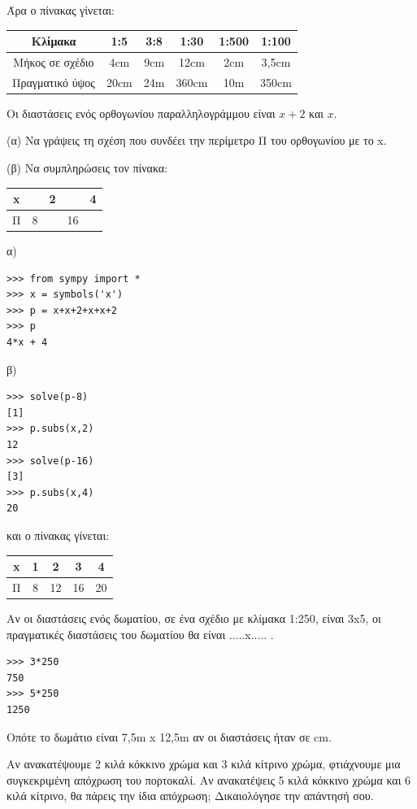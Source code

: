 Άρα ο πίνακας γίνεται:
\begin{table}
\begin{tabular}{|c|c|c|c|c|c|}
\hline
Κλίμακα&1:5&3:8&1:30&1:500&1:100\\\hline
Μήκος σε σχέδιο&4cm &9cm&12cm&2cm&3,5cm\\\hline
Πραγματικό ύψος&20cm&24m&360cm&10m&350cm\\\hline
\end{tabular}
\end{table}
\begin{exercise}
Οι διαστάσεις ενός ορθογωνίου παραλληλογράμμου είναι $x+2$ και $x$.

(α) Να γράψεις τη σχέση που συνδέει την περίμετρο Π του ορθογωνίου με το x.

(β) Να συμπληρώσεις τον πίνακα:
\begin{table}
\begin{tabular}{|c|c|c|c|c|}
x&&2&&4\\\hline
Π&8&&16&\\\hline
\end{tabular}
\end{table}
\end{exercise}
α)
\begin{lstlisting}
>>> from sympy import *
>>> x = symbols('x')
>>> p = x+x+2+x+x+2
>>> p
4*x + 4
\end{lstlisting}
β)
\begin{lstlisting}
>>> solve(p-8)
[1]
>>> p.subs(x,2)
12
>>> solve(p-16)
[3]
>>> p.subs(x,4)
20
\end{lstlisting}
και ο πίνακας γίνεται:
\begin{table}
\begin{tabular}{|c|c|c|c|c|}
\hline
x&1 &2  &3  &4\\\hline
Π&8&12&16&20\\\hline
\end{tabular}
\end{table}
\begin{exercise}
Aν οι διαστάσεις ενός δωματίου, σε ένα σχέδιο με κλίμακα 1:250, είναι 3x5, οι
πραγματικές διαστάσεις του δωματίου θα είναι .....x..... .
\end{exercise}
\begin{lstlisting}
>>> 3*250
750
>>> 5*250
1250
\end{lstlisting}
Οπότε το δωμάτιο είναι 7,5m x 12,5m αν οι διαστάσεις ήταν σε cm.
\begin{exercise}
Αν ανακατέψουμε 2 κιλά κόκκινο χρώμα και 3 κιλά κίτρινο χρώμα,
φτιάχνουμε μια συγκεκριμένη απόχρωση του πορτοκαλί. Αν
ανακατέψεις 5 κιλά κόκκινο χρώμα και 6 κιλά κίτρινο, θα πάρεις
την ίδια απόχρωση; Δικαιολόγησε την απάντησή σου.
\end{exercise}
